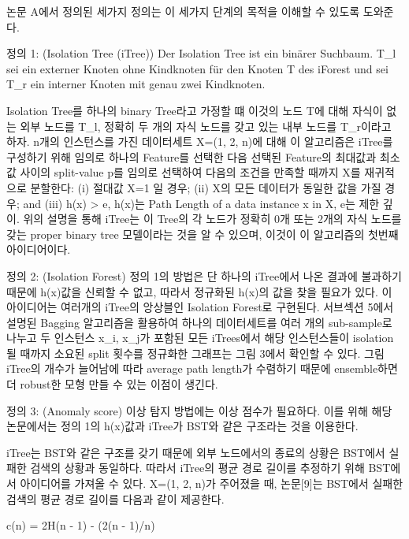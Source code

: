                 논문 A에서 정의된 세가지 정의는 이 세가지 단계의 목적을 이해할 수 있도록 도와준다.

                정의 1: (Isolation Tree (iTree))
                    Der Isolation Tree ist ein binärer Suchbaum. T_l sei ein externer Knoten ohne Kindknoten für den Knoten T des iForest und sei T_r ein interner Knoten mit genau zwei Kindknoten.

                    Isolation Tree를 하나의 binary Tree라고 가정할 떄 이것의 노드 T에 대해 자식이 없는 외부 노드를 T_l, 정확히 두 개의 자식 노드를 갖고 있는 내부 노드를 T_r이라고 하자. n개의 인스턴스를 가진 데이터세트 X=(1, 2, n)에 대해 이 알고리즘은 iTree를 구성하기 위해 임의로 하나의 Feature를 선택한 다음 선택된 Feature의 최대값과 최소값 사이의 split-value p를 임의로 선택하여 다음의 조건을 만족할 때까지 X를 재귀적으로 분할한다: (i) 절대값 X=1 일 경우; (ii) X의 모든 데이터가 동일한 값을 가질 경우; and (iii) h(x) > e, h(x)는 Path Length of a data instance x in X, e는 제한 깊이. 위의 설명을 통해 iTree는 이 Tree의 각 노드가 정확히 0개 또는 2개의 자식 노드를 갖는 proper binary tree 모델이라는 것을 알 수 있으며, 이것이 이 알고리즘의 첫번째 아이디어이다.

                정의 2: (Isolation Forest)
                    정의 1의 방법은 단 하나의 iTree에서 나온 결과에 불과하기 때문에 h(x)값을 신뢰할 수 없고, 따라서 정규화된 h(x)의 값을 찾을 필요가 있다. 이 아이디어는 여러개의 iTree의 앙상블인 Isolation Forest로 구현된다. 서브섹션 5에서 설명된 Bagging 알고리즘을 활용하여 하나의 데이터세트를 여러 개의 sub-sample로 나누고 두 인스턴스 x_i, x_j가 포함된 모든 iTrees에서 해당 인스턴스들이 isolation될 때까지 소요된 split 횟수를 정규화한 그래프는 그림 3에서 확인할 수 있다.
                    그림 \cite{Liu08}
                    iTree의 개수가 늘어남에 따라 average path length가 수렴하기 때문에 ensemble하면 더 robust한 모형 만들 수 있는 이점이 생긴다.

                정의 3: (Anomaly score)
                    이상 탐지 방법에는 이상 점수가 필요하다. 이를 위해 해당 논문에서는 정의 1의 h(x)값과 iTree가 BST와 같은 구조라는 것을 이용한다.
                    
                    iTree는 BST와 같은 구조를 갖기 때문에 외부 노드에서의 종료의 상황은 BST에서 실패한 검색의 상황과 동일하다. 따라서 iTree의 평균 경로 길이를 추정하기 위해 BST에서 아이디어를 가져올 수 있다. X=(1, 2, n)가 주어졌을 때, 논문[9]는 BST에서 실패한 검색의 평균 경로 길이를 다음과 같이 제공한다.
                    
                        c(n) = 2H(n - 1) - (2(n - 1)/n)

